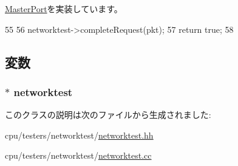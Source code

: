 \hyperlink{classMasterPort_abd323548d6c93f8b0543f1fe3a86ca35}{MasterPort}を実装しています。


\begin{DoxyCode}
55 {
56     networktest->completeRequest(pkt);
57     return true;
58 }
\end{DoxyCode}


\subsection{変数}
\hypertarget{classNetworkTest_1_1CpuPort_a72fd9e77dfa99f96f0972fe6c91e4543}{
\subsubsection[{networktest}]{$\ast$ {\bf networktest}}}
\label{classNetworkTest_1_1CpuPort_a72fd9e77dfa99f96f0972fe6c91e4543}


このクラスの説明は次のファイルから生成されました:\begin{DoxyCompactItemize}
\item 
cpu/testers/networktest/\hyperlink{networktest_8hh}{networktest.hh}\item 
cpu/testers/networktest/\hyperlink{networktest_8cc}{networktest.cc}\end{DoxyCompactItemize}
